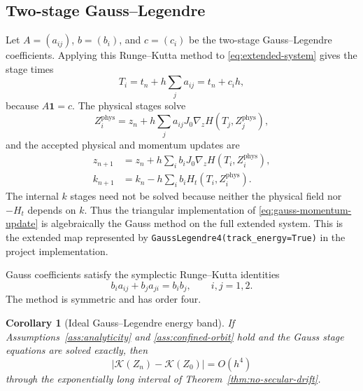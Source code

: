 \documentclass[11pt,a4paper]{article}
\newtheorem{corollary}[theorem]{Corollary}
\theoremstyle{definition}
\theoremstyle{remark}
\newcommand{\K}{\mathcal{K}}
\newcommand{\abs}[1]{\left\lvert #1\right\rvert}
\begin{document}
\subsection{Two-stage Gauss--Legendre}

Let $A=(a_{ij})$, $b=(b_i)$, and $c=(c_i)$ be the two-stage Gauss--Legendre
coefficients.  Applying this Runge--Kutta method to
\eqref{eq:extended-system} gives the stage times
\begin{equation}
 T_i=t_n+h\sum_j a_{ij}=t_n+c_ih,
 \label{eq:gauss-stage-times}
\end{equation}
because $A\mathbf{1}=c$.  The physical stages solve
\begin{equation}
 Z_i^{\mathrm{phys}}
 =z_n+h\sum_j a_{ij}
 J_0\nabla_zH(T_j,Z_j^{\mathrm{phys}}),
 \label{eq:gauss-physical-stages}
\end{equation}
and the accepted physical and momentum updates are
\begin{align}
 z_{n+1}
 &=z_n+h\sum_i b_iJ_0\nabla_zH(T_i,Z_i^{\mathrm{phys}}),
 \label{eq:gauss-physical-update}\\
 k_{n+1}
 &=k_n-h\sum_i b_iH_t(T_i,Z_i^{\mathrm{phys}}).
 \label{eq:gauss-momentum-update}
\end{align}
The internal $k$ stages need not be solved because neither the physical field
nor $-H_t$ depends on $k$.  Thus the triangular implementation of
\eqref{eq:gauss-momentum-update} is algebraically the Gauss method on the full
extended system.  This is the extended map represented by
\texttt{GaussLegendre4(track\_energy=True)} in the project implementation.

Gauss coefficients satisfy the symplectic Runge--Kutta identities
\begin{equation}
 b_i a_{ij}+b_j a_{ji}=b_ib_j,
 \qquad i,j=1,2.
 \label{eq:gauss-symplectic-condition}
\end{equation}
The method is symmetric and has order four.

\begin{corollary}[Ideal Gauss--Legendre energy band]
\label{cor:gauss-energy-band}
If Assumptions~\ref{ass:analyticity} and \ref{ass:confined-orbit} hold and the
Gauss stage equations are solved exactly, then
\begin{equation}
 \abs{\K(Z_n)-\K(Z_0)}=O(h^4)
 \label{eq:gauss-energy-band}
\end{equation}
through the exponentially long interval of
Theorem~\ref{thm:no-secular-drift}.
\end{corollary}
\end{document}
